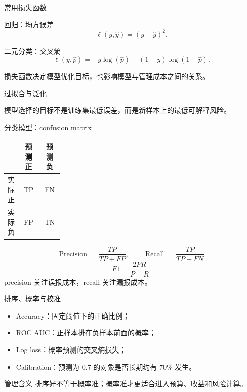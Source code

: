\documentclass[UTF8,fontset=fandol,aspectratio=169,11pt]{ctexbeamer}
\begin{document}
\begin{frame}{常用损失函数}
\begin{block}{回归：均方误差}
\[
  \ell(y,\hat y)=(y-\hat y)^2.
\]
\end{block}
\begin{block}{二元分类：交叉熵}
\[
  \ell(y,\hat p)=-y\log(\hat p)-(1-y)\log(1-\hat p).
\]
\end{block}
\small
损失函数决定模型优化目标，也影响模型与管理成本之间的关系。
\end{frame}

\begin{frame}{过拟合与泛化}
\begin{center}
\end{center}
\small
模型选择的目标不是训练集最低误差，而是新样本上的最低可解释风险。
\end{frame}

\begin{frame}{分类模型：confusion matrix}
\begin{center}
\begin{tabular}{p{0.22\linewidth}cc}
\toprule
 & 预测正 & 预测负\\
\midrule
实际正 & TP & FN\\
实际负 & FP & TN\\
\bottomrule
\end{tabular}
\end{center}
\[
  \operatorname{Precision}=\frac{TP}{TP+FP},
  \qquad
  \operatorname{Recall}=\frac{TP}{TP+FN}.
\]
\[
  F1=\frac{2PR}{P+R}.
\]
\small
precision 关注误报成本，recall 关注漏报成本。
\end{frame}

\begin{frame}{排序、概率与校准}
\begin{itemize}
  \item Accuracy：固定阈值下的正确比例；
  \item ROC AUC：正样本排在负样本前面的概率；
  \item Log loss：概率预测的交叉熵损失；
  \item Calibration：预测为 \(0.7\) 的对象是否长期约有 \(70\%\) 发生。
\end{itemize}
\begin{block}{管理含义}
排序好不等于概率准；概率准才更适合进入预算、收益和风险计算。
\end{block}
\end{frame}
\end{document}
